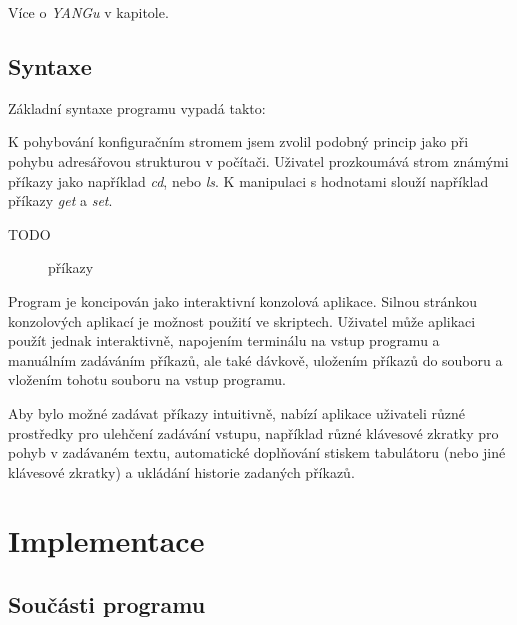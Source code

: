 \documentclass[thesis=B,czech]{FITthesis}[2019/03/06]
\begin{document}
Více o \textit{YANGu} v kapitole.


\section{Syntaxe}
Základní syntaxe programu vypadá takto:

K pohybování konfiguračním stromem jsem zvolil podobný princip jako při pohybu adresářovou strukturou v počítači. Uživatel prozkoumává strom známými příkazy jako například \textit{cd}, nebo \textit{ls}. K manipulaci s hodnotami slouží například příkazy \textit{get} a \textit{set}.

\begin{description} %
    \item[TODO]{příkazy}
\end{description}

Program je koncipován jako interaktivní konzolová aplikace. Silnou stránkou konzolových aplikací je možnost použití ve skriptech. Uživatel může aplikaci použít jednak interaktivně, napojením terminálu na vstup programu a manuálním zadáváním příkazů, ale také dávkově, uložením příkazů do souboru a vložením tohotu souboru na vstup programu.

Aby bylo možné zadávat příkazy intuitivně, nabízí aplikace uživateli různé prostředky pro ulehčení zadávání vstupu, například různé klávesové zkratky pro pohyb v zadávaném textu, automatické doplňování stiskem tabulátoru (nebo jiné klávesové zkratky) a ukládání historie zadaných příkazů.


\chapter{Implementace}

\section{Součásti programu}
\end{document}
